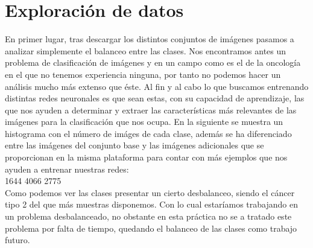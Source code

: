 \section{Exploración de datos}

En primer lugar, tras descargar los distintos conjuntos de imágenes pasamos a analizar simplemente el balanceo entre las clases. Nos encontramos antes un problema de clasificación de imágenes y en un campo como es el de la oncología en el que no tenemos experiencia ninguna, por tanto no podemos hacer un análisis mucho más extenso que éste. Al fin y al cabo lo que buscamos entrenando distintas redes neuronales es que sean estas, con su capacidad de aprendizaje, las que nos ayuden a determinar y extraer las características más relevantes de las imágenes para la clasificación que nos ocupa. En la siguiente se muestra un histograma con el número de imáges de cada clase, además se ha diferenciado entre las imágenes del conjunto base y las imágenes adicionales que se proporcionan en la misma plataforma para contar con más ejemplos que nos ayuden a entrenar nuestras redes:\\

1644 4066 2775\\

Como podemos ver las clases presentar un cierto desbalanceo, siendo el cáncer tipo 2 del que más muestras disponemos. Con lo cual estaríamos trabajando en un problema desbalanceado, no obstante en esta práctica no se a tratado este problema por falta de tiempo, quedando el balanceo de las clases como trabajo futuro.    
